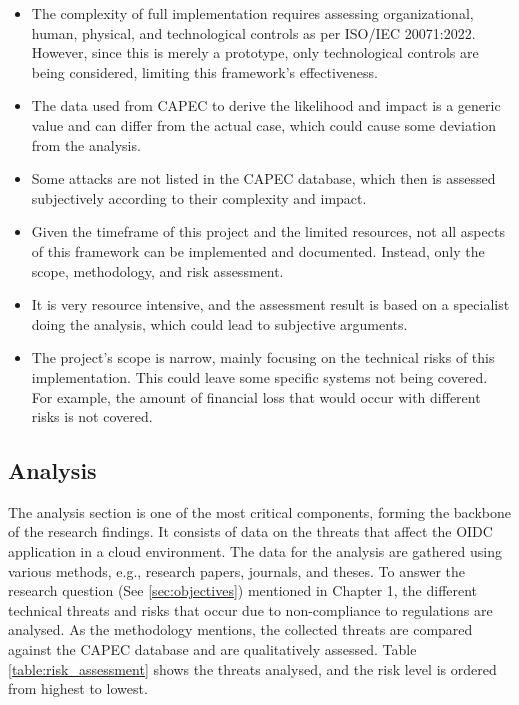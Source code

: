 \begin{itemize}
    \item The complexity of full implementation requires assessing organizational, human, physical, and technological controls as per ISO/IEC 20071:2022. However, since this is merely a prototype, only technological controls are being considered, limiting this framework's effectiveness.
    
    \item The data used from CAPEC to derive the likelihood and impact is a generic value and can differ from the actual case, which could cause some deviation from the analysis.
    
    \item Some attacks are not listed in the CAPEC database, which then is assessed subjectively according to their complexity and impact. 
    
    \item Given the timeframe of this project and the limited resources, not all aspects of this framework can be implemented and documented. Instead, only the scope, methodology, and risk assessment.
    
    \item It is very resource intensive, and the assessment result is based on a specialist doing the analysis, which could lead to subjective arguments.
    
    \item The project's scope is narrow, mainly focusing on the technical risks of this implementation. This could leave some specific systems not being covered. For example, the amount of financial loss that would occur with different risks is not covered.

\end{itemize}

\subsection{Analysis}
 The analysis section is one of the most critical components, forming the backbone of the research findings. It consists of data on the threats that affect the OIDC application in a cloud environment. The data for the analysis are gathered using various methods, e.g., research papers, journals, and theses. To answer the research question (See \ref{sec:objectives}) mentioned in Chapter 1, the different technical threats and risks that occur due to non-compliance to regulations are analysed. As the methodology mentions, the collected threats are compared against the CAPEC database and are qualitatively assessed. Table \ref{table:risk_assessment} shows the threats analysed, and the risk level is ordered from highest to lowest. 

